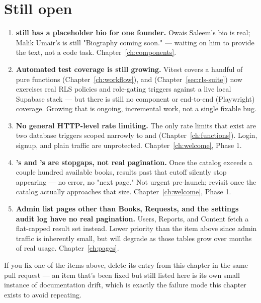 \section{Still open}

\begin{enumerate}
  \item \textbf{ still has a placeholder bio for one founder.} Owais Saleem's bio is real; Malik Umair's is still "Biography coming soon." — waiting on him to provide the text, not a code task. Chapter~\ref{ch:components}.
  \item \textbf{Automated test coverage is still growing.} Vitest covers a handful of pure functions (Chapter~\ref{ch:workflow}), and  (Chapter~\ref{sec:rls-suite}) now exercises real RLS policies and role-gating triggers against a live local Supabase stack — but there is still no component or end-to-end (Playwright) coverage. Growing that is ongoing, incremental work, not a single fixable bug.
  \item \textbf{No general HTTP-level rate limiting.} The only rate limits that exist are two database triggers scoped narrowly to  and  (Chapter~\ref{ch:functions}). Login, signup, and plain  traffic are unprotected. Chapter~\ref{ch:welcome}, Phase 1.
  \item \textbf{'s  and 's  are stopgaps, not real pagination.} Once the catalog exceeds a couple hundred available books, results past that cutoff silently stop appearing — no error, no "next page." Not urgent pre-launch; revisit once the catalog actually approaches that size. Chapter~\ref{ch:welcome}, Phase 1.
  \item \textbf{Admin list pages other than Books, Requests, and the settings audit log have no real pagination.} Users, Reports, and Content fetch a flat-capped result set instead. Lower priority than the item above since admin traffic is inherently small, but will degrade as those tables grow over months of real usage. Chapter~\ref{ch:pages}.
\end{enumerate}

\begin{olknote}
If you fix one of the items above, delete its entry from this chapter in the same pull request — an item that's been fixed but still listed here is its own small instance of documentation drift, which is exactly the failure mode this chapter exists to avoid repeating.
\end{olknote}
